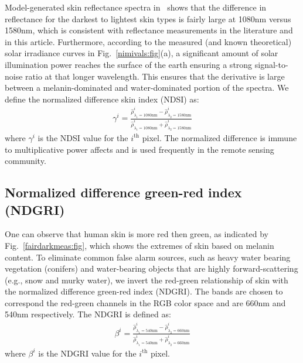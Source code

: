 \documentclass[10pt,journal,cspaper,compsoc]{IEEEtran}
\begin{document}
Model-generated skin reflectance spectra in~\cite{Nunez8} shows that the difference in reflectance 
for the darkest to lightest skin types is fairly large at 1080nm versus 1580nm, which is consistent with reflectance measurements 
in the literature and in this article. Furthermore, according to the measured (and known theoretical) 
solar irradiance curves in Fig.~\ref{nimivals:fig}(a), a significant amount of solar illumination power reaches the surface of 
the earth ensuring a strong signal-to-noise ratio at that longer wavelength. This ensures that the derivative is large between a 
melanin-dominated and water-dominated portion of the spectra. We define the normalized difference skin index (NDSI) as:
\begin{align}\label{NDSI:eq}
\gamma^{i}= \frac{\hat{\rho}^{i}_{\lambda_1=1080\text{nm}}-\hat{\rho}^{i}_{\lambda_2=1580\text{nm}}} 
{\hat{\rho}^{i}_{\lambda_1=1080\text{nm}}+\hat{\rho}^{i}_{\lambda_2=1580\text{nm}}}
\end{align}
\noindent where $\gamma^i$ is the NDSI value for the $i^{\text{th}}$ pixel.  The normalized difference is immune to 
multiplicative power affects and is used frequently in the remote sensing community.

\subsection{Normalized difference green-red index (NDGRI)}
\label{scn:ndgri}
One can observe that human skin is more red then green, as indicated by Fig.~\ref{fairdarkmeas:fig}, which shows the extremes of 
skin based on melanin content.  To eliminate common false alarm sources, such as heavy water bearing vegetation (conifers) 
and water-bearing objects that are highly forward-scattering (e.g., snow and murky water), we invert the red-green 
relationship of skin with the normalized difference green-red index (NDGRI). The bands are chosen to correspond the red-green 
channels in the RGB color space and are 660nm and 540nm respectively.  The NDGRI is defined as:
\begin{align}\label{NDGRI:eq}
\beta^{i}= \frac{\hat{\rho}^{i}_{\lambda_1=540\text{nm}}-\hat{\rho}^{i}_{\lambda_2=660\text{nm}}} {\hat{\rho}^{i}_{\lambda_1=540\text{nm}}+\hat{\rho}^{i}_{\lambda_2=660\text{nm}}}
\end{align}
\noindent where $\beta^i$ is the NDGRI value for the $i^{\text{th}}$ pixel.
\end{document}
